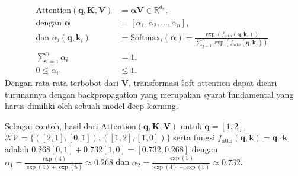 	\begin{align}
		\label{equ:soft-attention-start}
		\text{Attention}(\mathbf{q}, \mathbf{K}, \mathbf{V}) &= \mathbf{\alpha}\mathbf{V} \in \mathbb{R}^{d_v},\\
		\text{dengan } \bm{\alpha} &= [\alpha_{1}, \alpha_{2}, \dots, \alpha_{n}], \\
		\text{dan } \alpha_{i}(\mathbf{q},\mathbf{k}_i) &= \text{Softmax}_i(\bm{\alpha}) = \frac{\exp(f_{attn}(\mathbf{q}, \mathbf{k}_i))}{\sum_{j=1}^{n} \exp(f_{attn}(\mathbf{q}, \mathbf{k}_j))}, \\
		\sum_{i=1}^{n} \alpha_{i} &= 1, \\
		\label{equ:soft-attention-end}
		0 \leq \alpha_{i} &\leq 1.
	\end{align}
	Dengan rata-rata terbobot dari $\mathbf{V}$, transformasi \f{soft attention} dapat dicari turunannya dengan \f{backpropagation} yang merupakan syarat \f{fundamental} yang harus dimiliki oleh sebuah model \f{deep learning}.

	Sebagai contoh, hasil dari $\text{Attention}(\mathbf{q}, \mathbf{K}, \mathbf{V})$ untuk $\mathbf{q}= [1,2]$, $\mathcal{KV} = \{([2,1],[0,1]), ([1,2],[1,0])\}$ serta fungsi $f_\text{attn}(\mathbf{q}, \mathbf{k}) =\mathbf{q}\cdot \mathbf{k}$ adalah $0.268 [0,1] + 0.732 [1,0] = [0.732, 0.268]$ dengan $\alpha_1 = \frac{\exp(4)}{\exp(4) + \exp(5)} \approx 0.268$ dan $\alpha_2 = \frac{\exp(5)}{\exp(4) + \exp(5)} \approx 0.732$.

